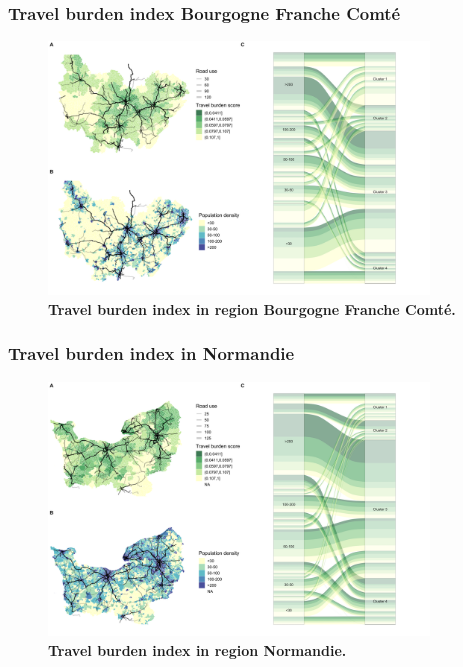\subsubsection{Travel burden index Bourgogne Franche Comté}

\begin{figure}[H]
    \includegraphics[width=0.9\textwidth]{images/routes/fig4_27.png}
    \centering
    \caption{
        \textbf{Travel burden index in region Bourgogne Franche Comté.}
    }
    \label{fig:routes-burden-index-bfc}
\end{figure}

\subsubsection{Travel burden index in Normandie}

\begin{figure}[H]
    \includegraphics[width=0.9\textwidth]{images/routes/fig4_28.png}
    \centering
    \caption{
        \textbf{Travel burden index in region Normandie.}
    }
    \label{fig:routes-burden-index-normandie}
\end{figure}

